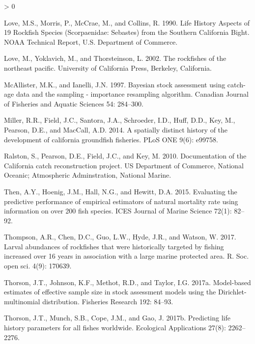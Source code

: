 \documentclass[11pt,
  english,
  a4paper,
]{article}
\newlength{\cslhangindent}
\newenvironment{CSLReferences}[2] %
 {%
  \setlength{\parindent}{0pt}
  \ifodd #1 \everypar{\setlength{\hangindent}{\cslhangindent}}\ignorespaces\fi
  \ifnum #2 > 0
  \setlength{\parskip}{#2\baselineskip}
  \fi
 }%
 {}
\begin{document}
\begin{CSLReferences}{1}{0}
\leavevmode\hypertarget{ref-love_life_1990}{}%
Love, M.S., Morris, P., McCrae, M., and Collins, R. 1990. Life {History} {Aspects} of 19 {Rockfish} {Species} ({Scorpaenidae}: {Sebastes}) from the {Southern} {California} {Bight}. NOAA Technical Report, U.S. Department of Commerce.

\leavevmode\hypertarget{ref-love_milton_rockfishes_2002}{}%
Love, M., Yoklavich, M., and Thorsteinson, L. 2002. The rockfishes of the northeast pacific. University of California Press, Berkeley, California.

\leavevmode\hypertarget{ref-mcallister_bayesian_1997}{}%
McAllister, M.K., and Ianelli, J.N. 1997. Bayesian stock assessment using catch-age data and the sampling - importance resampling algorithm. Canadian Journal of Fisheries and Aquatic Sciences 54: 284--300.

\leavevmode\hypertarget{ref-miller_spatially_2014}{}%
Miller, R.R., Field, J.C., Santora, J.A., Schroeder, I.D., Huff, D.D., Key, M., Pearson, D.E., and MacCall, A.D. 2014. A spatially distinct history of the development of california groundfish fisheries. {PLoS} {ONE} 9(6): e99758.

\leavevmode\hypertarget{ref-ralston_documentation_2010}{}%
Ralston, S., Pearson, D.E., Field, J.C., and Key, M. 2010. Documentation of the {California} catch reconstruction project. US Department of Commerce, National Oceanic; Atmospheric Adminstration, National Marine.

\leavevmode\hypertarget{ref-then_evaluating_2015-1}{}%
Then, A.Y., Hoenig, J.M., Hall, N.G., and Hewitt, D.A. 2015. Evaluating the predictive performance of empirical estimators of natural mortality rate using information on over 200 fish species. ICES Journal of Marine Science 72(1): 82--92.

\leavevmode\hypertarget{ref-thompson_larval_2017}{}%
Thompson, A.R., Chen, D.C., Guo, L.W., Hyde, J.R., and Watson, W. 2017. Larval abundances of rockfishes that were historically targeted by fishing increased over 16 years in association with a large marine protected area. R. Soc. open sci. 4(9): 170639.

\leavevmode\hypertarget{ref-thorson_model-based_2017}{}%
Thorson, J.T., Johnson, K.F., Methot, R.D., and Taylor, I.G. 2017a. Model-based estimates of effective sample size in stock assessment models using the {Dirichlet}-multinomial distribution. Fisheries Research 192: 84--93.

\leavevmode\hypertarget{ref-thorson_predicting_2017}{}%
Thorson, J.T., Munch, S.B., Cope, J.M., and Gao, J. 2017b. Predicting life history parameters for all fishes worldwide. Ecological Applications 27(8): 2262--2276.

\end{CSLReferences}
\end{document}
